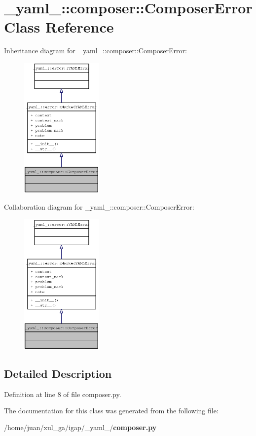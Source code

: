 \section{\_\-yaml\_\-::composer::ComposerError Class Reference}
\label{class__yaml___1_1composer_1_1ComposerError}
Inheritance diagram for \_\-yaml\_\-::composer::ComposerError:\nopagebreak
\begin{figure}[H]
\begin{center}
\leavevmode
\includegraphics[width=115pt]{class__yaml___1_1composer_1_1ComposerError__inherit__graph}
\end{center}
\end{figure}
Collaboration diagram for \_\-yaml\_\-::composer::ComposerError:\nopagebreak
\begin{figure}[H]
\begin{center}
\leavevmode
\includegraphics[width=115pt]{class__yaml___1_1composer_1_1ComposerError__coll__graph}
\end{center}
\end{figure}


\subsection{Detailed Description}


Definition at line 8 of file composer.py.

The documentation for this class was generated from the following file:\begin{CompactItemize}
\item 
/home/juan/xul\_\-ga/igap/\_\-yaml\_\-/{\bf composer.py}\end{CompactItemize}
